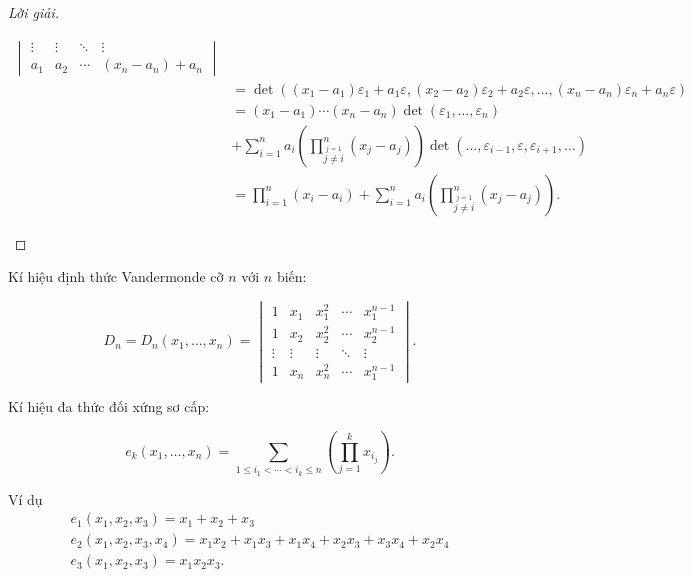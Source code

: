 \documentclass[class=linear-algebra,crop=false]{standalone}
\begin{document}
\begin{proof}[Lời giải]
\begin{enumerate}[label = (\alph*)]
\begin{align*}
\begin{vmatrix}
				      \vdots                  & \vdots                  & \ddots & \vdots                  \\
				      a_{1}                   & a_{2}                   & \cdots & (x_{n} - a_{n}) + a_{n}
			      \end{vmatrix}                                                                                       \\
			       & = \det((x_{1} - a_{1})\varepsilon_{1} + a_{1}\varepsilon, (x_{2} - a_{2})\varepsilon_{2} + a_{2}\varepsilon, \ldots, (x_{n} - a_{n})\varepsilon_{n} + a_{n}\varepsilon) \\
			       & = (x_{1} - a_{1})\cdots (x_{n} - a_{n})\det(\varepsilon_{1}, \ldots, \varepsilon_{n})                                                                                   \\
			       & + \sum^{n}_{i = 1}a_{i}\left(\prod^{n}_{\stackrel{j=1}{j\ne i}}(x_{j} - a_{j})\right)\det(\ldots, \varepsilon_{i-1}, \varepsilon, \varepsilon_{i+1}, \ldots)            \\
			       & = \prod^{n}_{i=1}(x_{i} - a_{i}) + \sum^{n}_{i=1}a_{i}\left(\prod^{n}_{\stackrel{j=1}{j\ne i}}(x_{j} - a_{j})\right).
		      \end{align*}
	\end{enumerate}
\end{proof}

\par Kí hiệu định thức Vandermonde cỡ $n$ với $n$ biến:

\[
	D_{n} = D_{n}(x_{1}, \ldots, x_{n}) =
	\begin{vmatrix}
		1      & x_{1}  & x_{1}^{2} & \cdots & x_{1}^{n-1} \\
		1      & x_{2}  & x_{2}^{2} & \cdots & x_{2}^{n-1} \\
		\vdots & \vdots & \vdots    & \ddots & \vdots      \\
		1      & x_{n}  & x_{n}^{2} & \cdots & x_{1}^{n-1}
	\end{vmatrix}.
\]

\par Kí hiệu đa thức đối xứng sơ cấp:

\[
	e_{k}(x_{1}, \ldots, x_{n}) = \sum_{1\le i_{1} < \cdots < i_{k} \le n}\left(\prod^{k}_{j=1}x_{i_{j}}\right).
\]

\par Ví dụ
\begin{gather*}
	e_{1}(x_{1}, x_{2}, x_{3}) = x_{1} + x_{2} + x_{3} \\
	e_{2}(x_{1}, x_{2}, x_{3}, x_{4}) = x_{1}x_{2} + x_{1}x_{3} + x_{1}x_{4} + x_{2}x_{3} + x_{3}x_{4} + x_{2}x_{4} \\
	e_{3}(x_{1}, x_{2}, x_{3}) = x_{1}x_{2}x_{3}.
\end{gather*}
\end{document}
